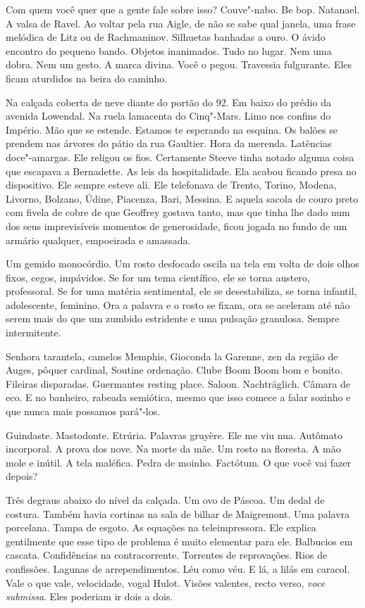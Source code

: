 Com quem você quer que a gente fale sobre isso? Couve"-nabo. Be bop.
Natanael. A valsa de Ravel. Ao voltar pela rua Aigle, de não se sabe
qual janela, uma frase melódica de Litz ou de Rachmaninov. Silhuetas
banhadas a ouro. O ávido encontro do pequeno bando. Objetos inanimados.
Tudo no lugar. Nem uma dobra. Nem um gesto. A marca divina. Você o
pegou. Travessia fulgurante. Eles ficam aturdidos na beira do caminho.

Na calçada coberta de neve diante do portão do 92. Em baixo do prédio da
avenida Lowendal. Na ruela lamacenta do Cinq"-Mars. Limo nos confins do
Império. Mão que se estende. Estamos te esperando na esquina. Os balões
se prendem nas árvores do pátio da rua Gaultier. Hora da merenda.
Latências doce"-amargas. Ele religou os fios. Certamente Steeve tinha
notado alguma coisa que escapava a Bernadette. As leis da hospitalidade.
Ela acabou ficando presa no dispositivo. Ele sempre esteve ali. Ele
telefonava de Trento, Torino, Modena, Livorno, Bolzano, Údine, Piacenza,
Bari, Messina. E aquela sacola de couro preto com fivela de cobre de que
Geoffrey gostava tanto, mas que tinha lhe dado num dos seus
imprevisíveis momentos de generosidade, ficou jogada no fundo de um
armário qualquer, empoeirada e amassada.

Um gemido monocórdio. Um rosto desfocado oscila na tela em volta de dois
olhos fixos, cegos, impávidos. Se for um tema científico, ele se torna
austero, professoral. Se for uma matéria sentimental, ele se
desestabiliza, se torna infantil, adolescente, feminino. Ora a palavra e
o rosto se fixam, ora se aceleram até não serem mais do que um zumbido
estridente e uma pulsação granulosa. Sempre intermitente.

Senhora tarantela, camelos Memphis, Gioconda la Garenne, zen da região
de Auges, pôquer cardinal, Soutine ordenação. Clube Boom Boom bom e
bonito. Fileiras disparadas. Guermantes resting place. Saloon.
Nachträglich. Câmara de eco. E no banheiro, rabeada semiótica, mesmo que
isso comece a falar sozinho e que nunca mais possamos pará"-los.

Guindaste. Mastodonte. Etrúria. Palavras gruyère. Ele me viu nua.
Autômato incorporal. A prova dos nove. Na morte da mãe. Um rosto na
floresta. A mão mole e inútil. A tela maléfica. Pedra de moinho.
Factótum. O que você vai fazer depois?

Três degraus abaixo do nível da calçada. Um ovo de Páscoa. Um dedal de
costura. Também havia cortinas na sala de bilhar de Maigremont. Uma
palavra porcelana. Tampa de esgoto. As equações na teleimpressora. Ele
explica gentilmente que esse tipo de problema é muito elementar para
ele. Balbucios em cascata. Confidências na contracorrente. Torrentes de
reprovações. Rios de confissões. Lagunas de arrependimentos. Léu como
véu. E lá, a lilás em caracol. Vale o que vale, velocidade, vogal Hulot.
Visões valentes, recto verso, \emph{voce submissa}. Eles poderiam ir
dois a dois.

